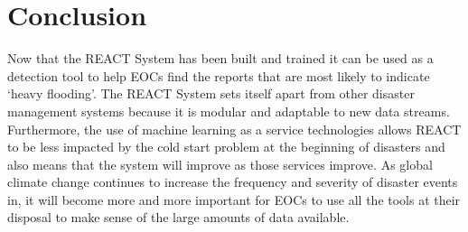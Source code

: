 \chapter{Conclusion}

Now that the REACT System has been built and trained it can be used as a
detection tool to help EOCs find the reports that are most likely to indicate
`heavy flooding'. The REACT System sets itself apart from other disaster
management systems because it is modular and adaptable to new data streams.
Furthermore, the use of machine learning as a service technologies allows REACT
to be less impacted by the cold start problem at the beginning of disasters and
also means that the system will improve as those services improve. As global
climate change continues to increase the frequency and severity of disaster events
in, it will become more and more important for EOCs to use all the tools at
their disposal to make sense of the large amounts of data available.
